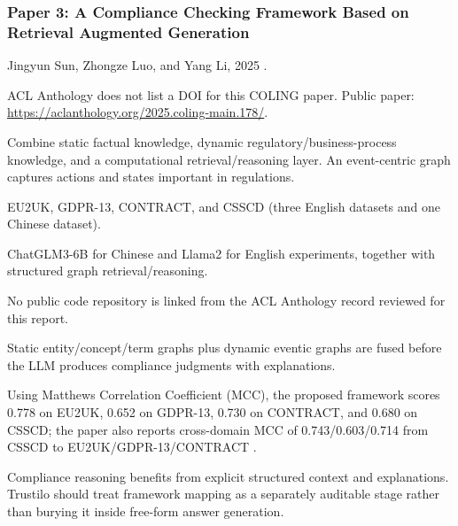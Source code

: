 \documentclass[11pt,journal,onecolumn]{IEEEtran}
\begin{document}
\subsubsection{Paper 3: A Compliance Checking Framework Based on Retrieval Augmented Generation}
\begin{description}[leftmargin=3.25cm,style=nextline]
\item[Authors / Year] Jingyun Sun, Zhongze Luo, and Yang Li, 2025 \cite{sun2025compliance}.
\item[DOI / Link] ACL Anthology does not list a DOI for this COLING paper. Public paper: \url{https://aclanthology.org/2025.coling-main.178/}.
\item[Main idea] Combine static factual knowledge, dynamic regulatory/business-process knowledge, and a computational retrieval/reasoning layer. An event-centric graph captures actions and states important in regulations.
\item[Datasets] EU2UK, GDPR-13, CONTRACT, and CSSCD (three English datasets and one Chinese dataset).
\item[Models] ChatGLM3-6B for Chinese and Llama2 for English experiments, together with structured graph retrieval/reasoning.
\item[Code] No public code repository is linked from the ACL Anthology record reviewed for this report.
\item[Procedure / tricks] Static entity/concept/term graphs plus dynamic eventic graphs are fused before the LLM produces compliance judgments with explanations.
\item[Metrics / results] Using Matthews Correlation Coefficient (MCC), the proposed framework scores 0.778 on EU2UK, 0.652 on GDPR-13, 0.730 on CONTRACT, and 0.680 on CSSCD; the paper also reports cross-domain MCC of 0.743/0.603/0.714 from CSSCD to EU2UK/GDPR-13/CONTRACT \cite{sun2025compliance}.
\item[Key learning] Compliance reasoning benefits from explicit structured context and explanations. Trustilo should treat framework mapping as a separately auditable stage rather than burying it inside free-form answer generation.
\end{description}
\end{document}
